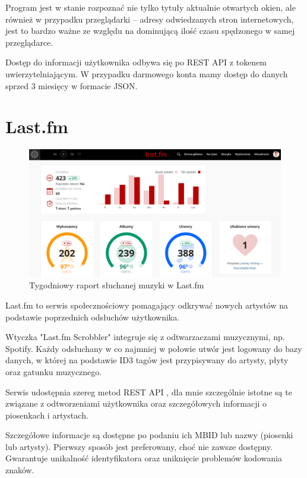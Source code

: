 \documentclass[brudnopis]{xmgr}
\begin{document}
            Program jest w stanie rozpoznać nie tylko tytuły aktualnie otwartych okien,
            ale również w przypadku przeglądarki – adresy odwiedzanych stron internetowych,
            jest to bardzo ważne ze względu na dominującą ilość czasu spędzonego w samej przeglądarce.

            Dostęp do informacji użytkownika odbywa się po REST API z tokenem uwierzytelniającym.
            W przypadku darmowego konta mamy dostęp do danych sprzed 3 miesięcy w formacie JSON.

        \section*{Last.fm}

            \begin{figure}
                \includegraphics[width=\linewidth]{fig/lastfm-weekly.png}
                \caption{Tygodniowy raport słuchanej muzyki w Last.fm}
                \label{fig:Last.fm}
            \end{figure}

            Last.fm to serwis społecznościowy pomagający odkrywać nowych artystów na podstawie poprzednich odsłuchów użytkownika.

            Wtyczka "Last.fm Scrobbler" \cite{lastfm:trackmymusic} integruje się z odtwarzaczami muzycznymi, np. Spotify.
            Każdy odsłuchany w co najmniej w połowie utwór jest logowany do bazy danych,
            w której na podstawie ID3 tagów jest przypisywany do artysty, płyty oraz gatunku muzycznego.

            Serwis udostępnia szereg metod REST API \cite{lastfm:apidoc}, dla mnie szczególnie istotne są te
            związane z odtworzeniami użytkownika oraz szczegółowych informacji o piosenkach i artystach.

            Szczegółowe informacje są dostępne po podaniu ich MBID\cite{lastfm:mbid} lub nazwy (piosenki lub artysty).
            Pierwszy sposób jest preferowany, choć nie zawsze dostępny. Gwarantuje unikalność identyfikatora oraz uniknięcie problemów kodowania znaków.
\end{document}
